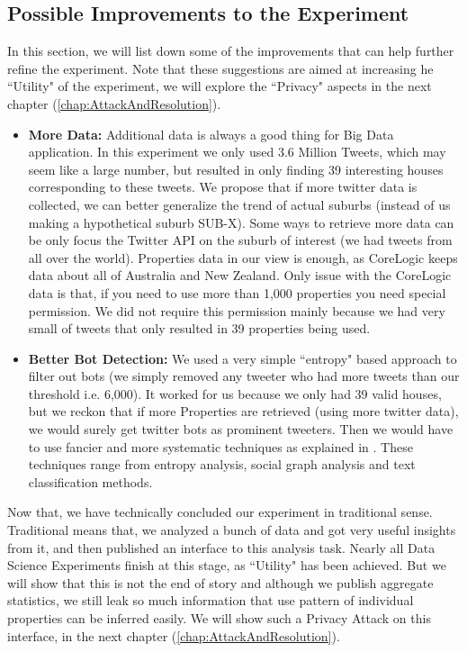 \documentclass[12pt]{report}
\theoremstyle{named}
\begin{document}
\subsection{Possible Improvements to the Experiment}
\label{sec:ImprovementsToExperiemnt}
In this section, we will list down some of the improvements that can help further refine the experiment. Note that these suggestions are aimed at increasing he ``Utility" of the experiment, we will explore the ``Privacy" aspects in the next chapter (\ref{chap:AttackAndResolution}).
\begin{itemize}
  \item \textbf{More Data:} Additional data is always a good thing for Big Data application. In this experiment we only used 3.6 Million Tweets, which may seem like a large number, but resulted in only finding 39 interesting houses corresponding to these tweets. We propose that if more twitter data is collected, we can better generalize the trend of actual suburbs (instead of us making a hypothetical suburb SUB-X). Some ways to retrieve more data can be only focus the Twitter API on the suburb of interest (we had tweets from all over the world). Properties data in our view is enough, as CoreLogic keeps data about all of Australia and New Zealand. Only issue with the CoreLogic data is that, if you need to use more than 1,000 properties you need special permission. We did not require this permission mainly because we had very small of tweets that only resulted in 39 properties being used.
  
  \item \textbf{Better Bot Detection:} We used a very simple ``entropy" based approach to filter out bots (we simply removed any tweeter who had more tweets than our threshold i.e. 6,000). It worked for us because we only had 39 valid houses, but we reckon that if more Properties are retrieved (using more twitter data), we would surely get twitter bots as prominent tweeters. Then we would have to use fancier and more systematic techniques as explained in \cite{chu2010tweeting}. These techniques range from entropy analysis, social graph analysis and text classification methods.

\end{itemize}


Now that, we have technically concluded our experiment in traditional sense. Traditional means that, we analyzed a bunch of data and got very useful insights from it, and then published an interface to this analysis task. Nearly all Data Science Experiments finish at this stage, as ``Utility" has been achieved. But we will show that this is not the end of story and although we publish aggregate statistics, we still leak so much information that use pattern of individual properties can be inferred easily. We will show such a Privacy Attack on this interface, in the next chapter (\ref{chap:AttackAndResolution}).
\end{document}
